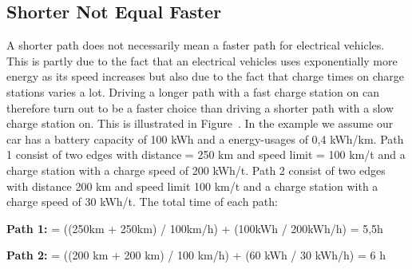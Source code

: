 \subsection{Shorter Not Equal Faster}

A shorter path does not necessarily mean a faster path for electrical vehicles. 
This is partly due to the fact that an electrical vehicles uses exponentially more energy 
as its speed increases but also due to the fact that charge times on charge stations
varies a lot. Driving a longer path with a fast charge station on can therefore turn out to
be a faster choice than driving a shorter path with a slow charge station on. This is illustrated 
in Figure~. In the example we assume our car has a battery capacity of 100 kWh and a energy-usages of
0,4 kWh/km. Path 1 consist of two edges with distance = 250 km and speed limit = 100 km/t
and a charge station with a charge speed of 200 kWh/t. Path 2 consist of two edges with
distance 200 km and speed limit 100 km/t and a charge station with a charge speed of 30 kWh/t.
The total time of each path:
				
\textbf{Path 1:}  = ((250km + 250km) / 100km/h) + (100kWh / 200kWh/h) = 5,5h
				
\textbf{Path 2:}  = ((200 km + 200 km) / 100 km/h) + (60 kWh / 30 kWh/h) = 6 h